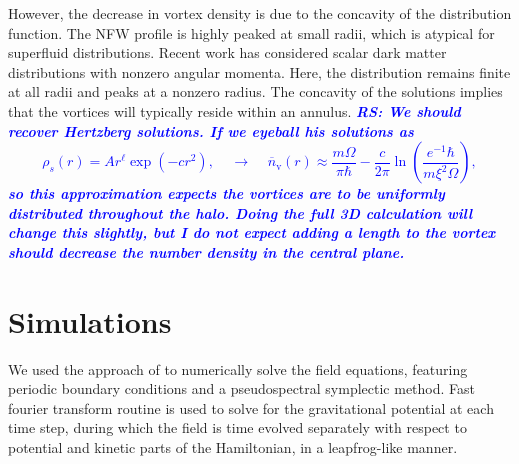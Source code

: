 \documentclass[onecolumn,nofootinbib,superscriptaddress]{revtex4}
\newcommand{\rs}[1]{\textcolor{blue}{\it{\textbf{RS: #1}}} }
\begin{document}
However, the decrease in vortex density is due to the concavity of the distribution function.  The NFW profile is highly peaked at small radii, which is atypical for superfluid distributions.  Recent work \cite{Hertzberg:2018lmt} has considered scalar dark matter distributions with nonzero angular momenta.  Here, the distribution remains finite at all radii and peaks at a nonzero radius.  The concavity of the solutions implies that the vortices will typically reside within an annulus. {\rs{We should recover Hertzberg solutions.  If we eyeball his solutions as
\begin{equation}
\rho_s(r) = Ar^\ell \exp\left(-c r^2\right), \;\;\;\;\rightarrow \;\;\;\; \overline{n}_\text{v}(r) \approx \frac{m\Omega}{\pi\hbar} - \frac{c}{2\pi}\ln \left(\frac{e^{-1}\hbar}{m\xi^2 \Omega}\right),\nonumber
\end{equation}
so this approximation expects the vortices are to be uniformly distributed throughout the halo.  Doing the full 3D calculation will change this slightly, but I do not expect adding a length to the vortex should decrease the number density in the central plane.}}




\section{Simulations}

We used the approach of \cite{Mocz:2017wlg} to numerically solve the field equations, featuring periodic boundary conditions and a pseudospectral symplectic method. Fast fourier transform routine is used to solve for the gravitational potential at each time step, during which the field is time evolved separately with respect to potential and kinetic parts of the Hamiltonian, in a leapfrog-like manner. 
\end{document}
